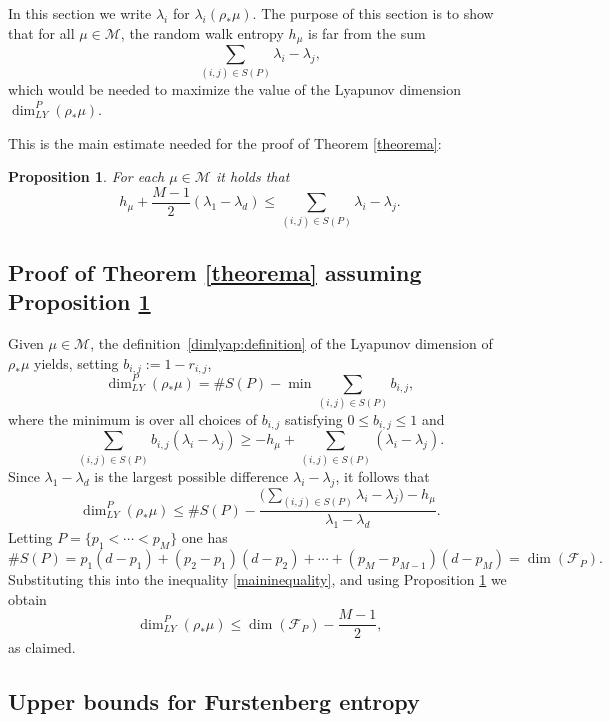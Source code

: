 \documentclass[JEP,XML,SOM,Unicode,NoEqCountersInSection,published]{cedram}
\newtheorem{proposition}[theorem]{Proposition}
\newcommand{\F}{\mathcal{F}}
\newcommand{\M}{\mathcal M}
\begin{document}
In this section we write \(\lambda_i\) for \(\lambda_i(\rho_*\mu)\). The purpose of this section is to show that for all \(\mu \in \M\), the random walk entropy \(h_\mu\) is far from the sum
\[
\sum_{(i,j) \in S(P)}\lambda_i - \lambda_j,
\]
which would be needed to maximize the value of the Lyapunov dimension \(\dim_{LY}^P(\rho_*\mu)\).

This is the main estimate needed for the proof of Theorem \ref{theorema}:
\begin{proposition}\label{mainlemma}
For each \(\mu \in \M\) it holds that
\[
h_\mu + \frac{M- 1}{2}\left(\lambda_1 - \lambda_d\right) \le \sum_{(i,j) \in S(P)}\lambda_i - \lambda_j.
\]
\end{proposition}

\subsection{Proof of Theorem \ref{theorema} assuming Proposition \ref{mainlemma}}

Given \(\mu \in \M\), the definition~\eqref{dimlyap:definition} of the Lyapunov dimension of \(\rho_\ast \mu \) yields, setting \(b_{i,j} := 1-r_{i,j}\),
\begin{equation}\label{lyapunovdimensionequation}
\dim_{LY}^P(\rho_*\mu) = \# S(P) -\min \sum_{(i,j) \in S(P)} b_{i,j},
\end{equation}
where the minimum is over all choices of \(b_{i,j}\) satisfying \(0 \le b_{i,j} \le 1\) and
\[
\sum_{(i,j) \in S(P)}b_{i,j} (\lambda_i - \lambda_j)\geq - h_\mu + \sum_{(i,j) \in S(P)}(\lambda_i - \lambda_j).
\]
Since \(\lambda_1 - \lambda_d\) is the largest possible difference \(\lambda_i -\lambda_j\), it follows that
\begin{equation}\label{maininequality}
\dim_{LY}^P(\rho_*\mu) \le \# S(P) - \frac{\bigl(\sum_{(i,j) \in S(P)}\lambda_i - \lambda_j\bigr) - h_\mu}{\lambda_1-\lambda_d}.\end{equation}
Letting \(P = \lbrace p_1 < \cdots < p_{M} \rbrace\) one has
\[
\# S(P) = p_1(d-p_1) + (p_2-p_1)(d-p_2) + \cdots + (p_{M} - p_{M-1})(d-p_{M}) = \dim(\F_{P}).
\]
Substituting this into the inequality \eqref{maininequality}, and using Proposition \ref{mainlemma} we obtain
\[
\dim_{LY}^P(\rho_*\mu) \le \dim(\F_{P}) - \frac{M - 1}{2},
\]
as claimed.

\subsection{Upper bounds for Furstenberg entropy}
\end{document}
